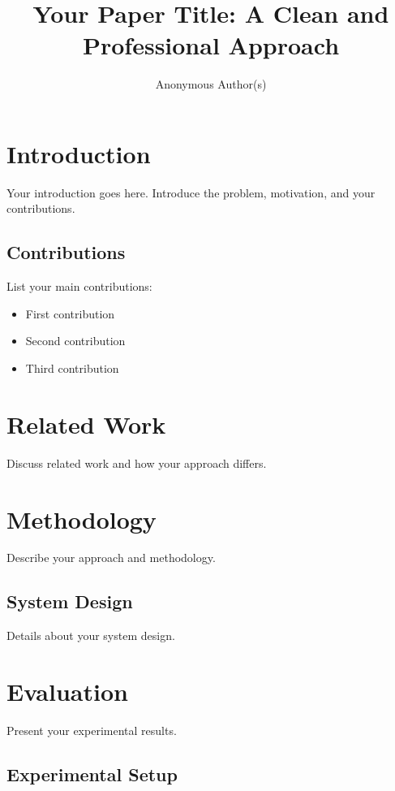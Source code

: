 \documentclass[sigconf, nonacm, anonymous]{acmart}
\title{Your Paper Title: A Clean and Professional Approach}
\author{Anonymous Author(s)}
\affiliation{%
  \institution{Anonymous Institution}
  \city{Anonymous City}
  \country{Anonymous Country}
}
\begin{document}
\maketitle

\section{Introduction}

Your introduction goes here. Introduce the problem, motivation, and your contributions.

\subsection{Contributions}

List your main contributions:
\begin{itemize}
  \item First contribution
  \item Second contribution
  \item Third contribution
\end{itemize}

\section{Related Work}

Discuss related work and how your approach differs.

\section{Methodology}

Describe your approach and methodology.

\subsection{System Design}

Details about your system design.

\section{Evaluation}

Present your experimental results.

\subsection{Experimental Setup}
\end{document}
